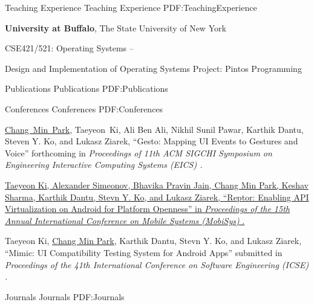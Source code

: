 \documentclass[letterpaper,MMMyyyy,nonstopmode]{simpleresumecv}
\begin{document}
\begin{Body}

\Section
{Teaching Experience}
{Teaching Experience}
{PDF:TeachingExperience}

\Entry
\textbf{University at Buffalo}, The State University of New York

\Gap
\BulletItem
CSE421/521: Operating Systems
\hfill
{} --
\begin{Detail}
\SubBulletItem
Design and Implementation of Operating Systems
\SubBulletItem
Project: Pintos Programming
\end{Detail}




\Section
{Publications}
{Publications}
{PDF:Publications}

\SubSection
{Conferences}
{Conferences}
{PDF:Conferences}

\begingroup
\renewcommand{\MaxNumberedItem}{[88]}

\BigGap
\NumberedItem{[1]}
\underline{Chang~Min~Park}, Taeyeon~Ki, Ali Ben Ali, 
Nikhil Sunil Pawar, Karthik Dantu, Steven Y. Ko, and Lukasz Ziarek, 
``Gesto: Mapping UI Events to Gestures and Voice''
forthcoming in
\textit{Proceedings of 11th ACM SIGCHI Symposium on Engineering Interactive Computing Systems (EICS)
.}

\Gap
\NumberedItem{[2]}
\href{https://dl.acm.org/citation.cfm?id=3081341}
{Taeyeon Ki, Alexander Simeonov, Bhavika Pravin Jain, \underline{Chang Min Park},
Keshav Sharma, Karthik Dantu, Stevn Y. Ko, and Lukasz Ziarek, 
``Reptor: Enabling API Virtualization on Android for Platform Openness'' in 
\textit{Proceedings of the 15th Annual International Conference on Mobile Systems (MobiSys)
}.}

\Gap
\NumberedItem{[3]}
Taeyeon Ki, \underline{Chang Min Park}, Karthik Dantu, Stevn Y. Ko, and Lukasz Ziarek, 
``Mimic: UI Compatibility Testing System for Android Apps'' submitted in 
\textit{Proceedings of the 41th International Conference on Software Engineering (ICSE)
.}


\BigGap
\SubSection
{Journals}
{Journals}
{PDF:Journals}

\begingroup
\renewcommand{\MaxNumberedItem}{[88]}


\end{Body}
\end{document}
